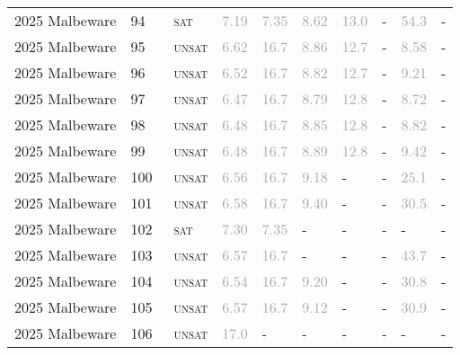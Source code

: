 \begin{center}
{\begin{longtable}{@{}llllllllll@{}}
2025 Malbeware & 94 & ~\textsc{sat} & \textcolor{darkgray}{7.19} & \textcolor{darkgray}{7.35} & \textcolor{darkgray}{8.62} & \textcolor{darkgray}{13.0} & - & \textcolor{darkgray}{54.3} & - \\
2025 Malbeware & 95 & ~\textsc{unsat} & \textcolor{darkgray}{6.62} & \textcolor{darkgray}{16.7} & \textcolor{darkgray}{8.86} & \textcolor{darkgray}{12.7} & - & \textcolor{darkgray}{8.58} & - \\
2025 Malbeware & 96 & ~\textsc{unsat} & \textcolor{darkgray}{6.52} & \textcolor{darkgray}{16.7} & \textcolor{darkgray}{8.82} & \textcolor{darkgray}{12.7} & - & \textcolor{darkgray}{9.21} & - \\
2025 Malbeware & 97 & ~\textsc{unsat} & \textcolor{darkgray}{6.47} & \textcolor{darkgray}{16.7} & \textcolor{darkgray}{8.79} & \textcolor{darkgray}{12.8} & - & \textcolor{darkgray}{8.72} & - \\
2025 Malbeware & 98 & ~\textsc{unsat} & \textcolor{darkgray}{6.48} & \textcolor{darkgray}{16.7} & \textcolor{darkgray}{8.85} & \textcolor{darkgray}{12.8} & - & \textcolor{darkgray}{8.82} & - \\
2025 Malbeware & 99 & ~\textsc{unsat} & \textcolor{darkgray}{6.48} & \textcolor{darkgray}{16.7} & \textcolor{darkgray}{8.89} & \textcolor{darkgray}{12.8} & - & \textcolor{darkgray}{9.42} & - \\
2025 Malbeware & 100 & ~\textsc{unsat} & \textcolor{darkgray}{6.56} & \textcolor{darkgray}{16.7} & \textcolor{darkgray}{9.18} & - & - & \textcolor{darkgray}{25.1} & - \\
2025 Malbeware & 101 & ~\textsc{unsat} & \textcolor{darkgray}{6.58} & \textcolor{darkgray}{16.7} & \textcolor{darkgray}{9.40} & - & - & \textcolor{darkgray}{30.5} & - \\
2025 Malbeware & 102 & ~\textsc{sat} & \textcolor{darkgray}{7.30} & \textcolor{darkgray}{7.35} & - & - & - & - & - \\
2025 Malbeware & 103 & ~\textsc{unsat} & \textcolor{darkgray}{6.57} & \textcolor{darkgray}{16.7} & - & - & - & \textcolor{darkgray}{43.7} & - \\
2025 Malbeware & 104 & ~\textsc{unsat} & \textcolor{darkgray}{6.54} & \textcolor{darkgray}{16.7} & \textcolor{darkgray}{9.20} & - & - & \textcolor{darkgray}{30.8} & - \\
2025 Malbeware & 105 & ~\textsc{unsat} & \textcolor{darkgray}{6.57} & \textcolor{darkgray}{16.7} & \textcolor{darkgray}{9.12} & - & - & \textcolor{darkgray}{30.9} & - \\
2025 Malbeware & 106 & ~\textsc{unsat} & \textcolor{darkgray}{17.0} & - & - & - & - & - & - \\

\end{longtable}}
\end{center}
